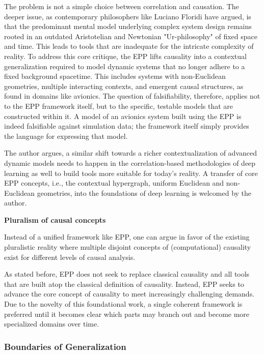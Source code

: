 The problem is not a simple choice between correlation and causation. The deeper issue, as contemporary philosophers
like Luciano Floridi have argued, is that the predominant mental model underlying complex system design remains rooted
in an outdated Aristotelian and Newtonian "Ur-philosophy" of fixed space and time. This leads to tools that are
inadequate for the intricate complexity of reality. To address this core critique, the EPP lifts causality into a
contextual generalization required to model dynamic systems that no longer adhere to a fixed background spacetime. This
includes systems with non-Euclidean geometries, multiple interacting contexts, and emergent causal structures, as found
in domains like avionics. The question of falsifiability, therefore, applies not to the EPP framework itself, but to the
specific, testable models that are constructed within it. A model of an avionics system built using the EPP is indeed
falsifiable against simulation data; the framework itself simply provides the language for expressing that model.

The author argues, a similar shift towards a richer contextualization of advanced dynamic models needs to happen in the
correlation-based methodologies of deep learning as well to build tools more suitable for today's reality. A
transfer of core EPP concepts, i.e., the contextual hypergraph, uniform Euclidean and non-Euclidean geometries, into the
foundations of deep learning is welcomed by the author.

\textbf{Pluralism of causal concepts}

Instead of a unified framework like EPP, one can argue in favor of the existing pluralistic reality where multiple 
disjoint concepts of (computational) causality exist for different levels of causal analysis.

As stated before, EPP does not seek to replace classical causality and all tools that are built atop the classical
definition of causality. Instead, EPP seeks to advance the core concept of causality to meet increasingly challenging
demands. Due to the novelty of this foundational work, a single coherent framework is preferred until it becomes clear
which parts may branch out and become more specialized domains over time.

\newpage

\subsubsection{Boundaries of Generalization}

